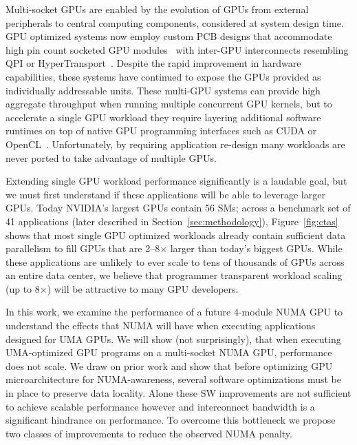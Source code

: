 Multi-socket GPUs are enabled by the evolution of GPUs from external
peripherals to central computing components, considered at system design time.  
GPU optimized systems now employ custom PCB designs that accommodate 
high pin count socketed GPU modules~\cite{dgx} with inter-GPU interconnects resembling 
QPI or HyperTransport~\cite{NVLINK,INTELQPI,AMDHT}.  Despite the rapid 
improvement in hardware capabilities, these systems have 
continued to expose the GPUs provided as individually addressable units. These
multi-GPU systems can provide high aggregate throughput when running multiple concurrent
GPU kernels, but to accelerate a single GPU workload they
require layering additional software runtimes on top of native GPU programming 
interfaces such as CUDA or OpenCL~\cite{CUDA,OPENCL}. Unfortunately, by requiring
application re-design many workloads are never ported to take advantage
of multiple GPUs.

Extending single GPU workload performance significantly is a laudable
goal, but we must first understand if these applications will be able to leverage
larger GPUs.  Today NVIDIA's largest GPUs contain 56 SMs; across a benchmark set of 41 applications
(later described in Section~\ref{sec:methodology}),
Figure~\ref{fig:ctas} shows that most single GPU optimized workloads already
contain sufficient data parallelism to fill GPUs that are 2--8$\times$ larger 
than today's biggest GPUs.  While these applications are unlikely to ever scale to tens
of thousands of GPUs across an entire data center, we believe that programmer
transparent workload scaling (up to 8$\times$) will
be attractive to many GPU developers.

In this work, we examine the performance of a future 4-module NUMA GPU to 
understand the effects that NUMA will have when executing applications designed 
for UMA GPUs. We will show (not surprisingly), that when executing UMA-optimized 
GPU programs on a multi-socket NUMA GPU, performance does not scale.  We draw on 
prior work and show that before optimizing GPU microarchitecture for 
NUMA-awareness, several software optimizations must be in place to preserve data 
locality.  Alone these SW improvements are not sufficient to achieve scalable 
performance however and interconnect bandwidth is a significant hindrance on 
performance.  To overcome this bottleneck we propose two classes of improvements 
to reduce the observed NUMA penalty.

